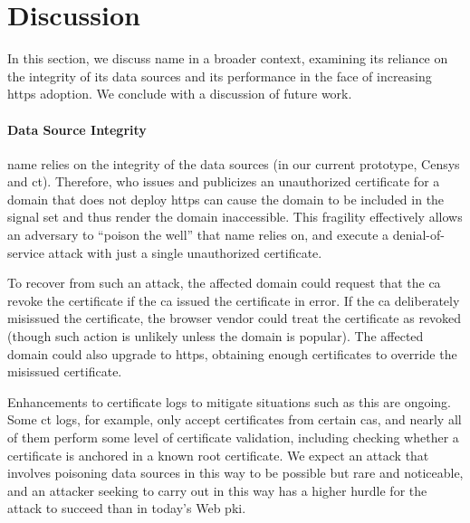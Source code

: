 \section{Discussion}
\label{sec:discussion}

In this section, we discuss \ac{name} in a broader context, examining its
reliance on the integrity of its data sources and its performance in
the face of increasing \ac{https} adoption. We conclude with a discussion of
future work.

\paragraph{Data Source Integrity}

\ac{name} relies on the integrity of the data sources (in our current prototype,
Censys and \ac{ct}). Therefore,  who issues
and publicizes an unauthorized certificate for a domain that does not deploy
\ac{https} can cause the domain to be included in the signal set and thus render
the domain inaccessible. This fragility effectively allows an adversary to
``poison the well'' that \ac{name} relies on, and execute a denial-of-service
attack with just a single unauthorized certificate.

To recover from such an attack, the
affected domain could request that the \ac{ca} revoke the certificate if the
\ac{ca} issued the certificate in error. If the \ac{ca} deliberately misissued
the certificate, the browser vendor could treat the certificate as revoked
(though such action is unlikely unless the domain is popular). The affected
domain could also upgrade to \ac{https}, obtaining enough certificates to
override the misissued certificate. 

Enhancements to certificate logs to mitigate situations such as this are ongoing. Some
\ac{ct} logs, for example, only accept certificates from certain \acp{ca}, and
nearly all of them perform some level of certificate validation, including
checking whether a certificate is anchored in a known root certificate. We
expect an attack that involves poisoning data sources in this way to be possible
but rare and noticeable, and an attacker seeking to carry out  in this way has a
higher hurdle for the attack to succeed than in today's Web \ac{pki}.

